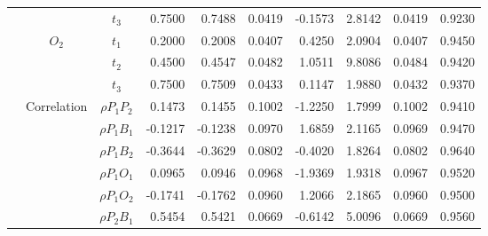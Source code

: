 \documentclass[letterpaper]{article}
\begin{document}
\begin{table}[h]
\begin{tabular}{cccrrrrrrr}
            &             & $t_3$          & 0.7500                 & 0.7488                 & 0.0419                 & -0.1573                & 2.8142                 & 0.0419                   & 0.9230                 \\
            & $O_2$       & $t_1$          & 0.2000                 & 0.2008                 & 0.0407                 & 0.4250                 & 2.0904                 & 0.0407                   & 0.9450                 \\
            &             & $t_2$          & 0.4500                 & 0.4547                 & 0.0482                 & 1.0511                 & 9.8086                 & 0.0484                   & 0.9420                 \\
            &             & $t_3$          & 0.7500                 & 0.7509                 & 0.0433                 & 0.1147                 & 1.9880                 & 0.0432                   & 0.9370                 \\
            & Correlation & $\rho{P_1P_2}$ & 0.1473                 & 0.1455                 & 0.1002                 & -1.2250                & 1.7999                 & 0.1002                   & 0.9410                 \\
            &             & $\rho{P_1B_1}$ & -0.1217                & -0.1238                & 0.0970                 & 1.6859                 & 2.1165                 & 0.0969                   & 0.9470                 \\
            &             & $\rho{P_1B_2}$ & -0.3644                & -0.3629                & 0.0802                 & -0.4020                & 1.8264                 & 0.0802                   & 0.9640                 \\
            &             & $\rho{P_1O_1}$ & 0.0965                 & 0.0946                 & 0.0968                 & -1.9369                & 1.9318                 & 0.0967                   & 0.9520                 \\
            &             & $\rho{P_1O_2}$ & -0.1741                & -0.1762                & 0.0960                 & 1.2066                 & 2.1865                 & 0.0960                   & 0.9500                 \\
            &             & $\rho{P_2B_1}$ & 0.5454                 & 0.5421                 & 0.0669                 & -0.6142                & 5.0096                 & 0.0669                   & 0.9560                 \\

\end{tabular}
\end{table}
\end{document}
